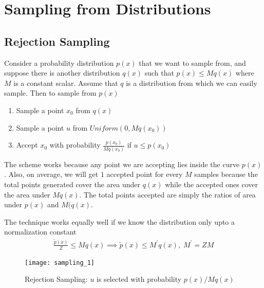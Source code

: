 \documentclass[../../statistical_learning_notes.tex]{subfiles}
\begin{document}
\section{Sampling from Distributions}
\subsection{Rejection Sampling}
Consider a probability distribution $p(x)$ that we want to sample from, and suppose there is another distribution $q(x)$ such that $p(x) \leq Mq(x)$ where $M$ is a constant scalar. Assume that $q$ is a distribution from which we can easily sample. Then to sample from $p(x)$
\begin{enumerate}
    \item Sample a point $x_{0}$ from $q(x)$
    \item Sample a point $u$ from $Uniform(0,Mq(x_{0}))$
    \item Accept $x_{0}$ with probability $\frac{p(x_{0})}{Mq(x_{0})}$ if $u \leq p(x_{0})$
\end{enumerate}

The scheme works because any point we are accepting lies inside the curve $p(x)$. Also, on average, we will get $1$ accepted point for every $M$ samples because the total points generated cover the area under $q(x)$ while the accepted ones cover the area under $Mq(x)$. The total points accepted are simply the ratios of area under $p(x)$ and $M(q(x)$.\newline

The technique works equally well if we know the distribution only upto a normalization constant
\begin{gather*}
    \frac{\tilde{p}(x)}{Z} \leq Mq(x) \implies \tilde{p}(x) \leq M^{\prime}q(x), \; M^{\prime} = ZM
\end{gather*}

\begin{figure}[h]
\texttt{[image: sampling\_1]}
\centering
\caption{Rejection Sampling: $u$ is selected with probability $p(x)/Mq(x)$}
\label{fig:sampling_1} %
\end{figure}


\end{document}

